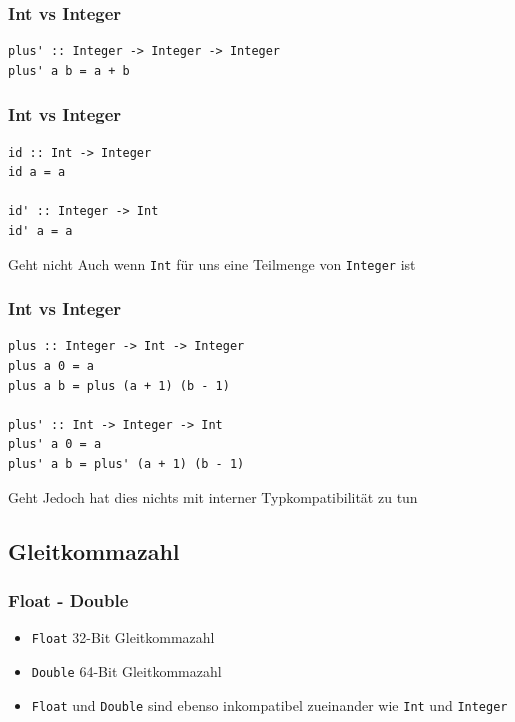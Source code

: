 \documentclass[fleqn,11pt,aspectratio=43]{beamer}
\begin{document}
\begin{frame}[fragile]
\frametitle{Int vs Integer} 
\begin{lstlisting}
plus' :: Integer -> Integer -> Integer
plus' a b = a + b
\end{lstlisting}
\end{frame}

\begin{frame}[fragile]
\frametitle{Int vs Integer} 
\begin{lstlisting}
id :: Int -> Integer
id a = a

id' :: Integer -> Int
id' a = a
\end{lstlisting}
\begin{alertblock}{Geht nicht}
Auch wenn \lstinline|Int| für uns eine Teilmenge von \lstinline|Integer| ist
\end{alertblock}
\end{frame}

\begin{frame}[fragile]
\frametitle{Int vs Integer} 
\begin{lstlisting}
plus :: Integer -> Int -> Integer
plus a 0 = a
plus a b = plus (a + 1) (b - 1)

plus' :: Int -> Integer -> Int
plus' a 0 = a
plus' a b = plus' (a + 1) (b - 1)
\end{lstlisting}
\begin{alertblock}{Geht}
Jedoch hat dies nichts mit interner Typkompatibilität zu tun
\end{alertblock}
\end{frame}

\subsection{Gleitkommazahl}
\begin{frame}
\frametitle{Float - Double}
\begin{block}{\vspace*{-2ex}}
\begin{itemize}
  \item \lstinline|Float| 32-Bit Gleitkommazahl 
  \item \lstinline|Double| 64-Bit Gleitkommazahl
  \item \lstinline|Float| und \lstinline|Double| sind ebenso inkompatibel zueinander wie \lstinline|Int| und \lstinline|Integer|
\end{itemize}
\end{block}
\end{frame}
\end{document}
